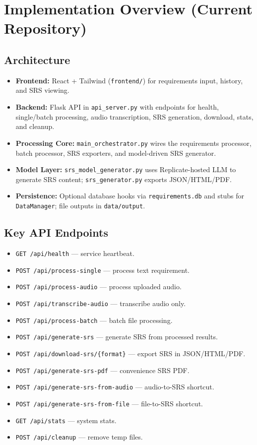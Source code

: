 \documentclass[11pt]{article}
\begin{document}
\section{Implementation Overview (Current Repository)}
\subsection{Architecture}
\begin{itemize}
  \item \textbf{Frontend:} React + Tailwind (\texttt{frontend/}) for requirements input, history, and SRS viewing.
  \item \textbf{Backend:} Flask API in \texttt{api\_server.py} with endpoints for health, single/batch processing, audio transcription, SRS generation, download, stats, and cleanup.
  \item \textbf{Processing Core:} \texttt{main\_orchestrator.py} wires the requirements processor, batch processor, SRS exporters, and model-driven SRS generator.
  \item \textbf{Model Layer:} \texttt{srs\_model\_generator.py} uses Replicate-hosted LLM to generate SRS content; \texttt{srs\_generator.py} exports JSON/HTML/PDF.
  \item \textbf{Persistence:} Optional database hooks via \texttt{requirements.db} and stubs for \texttt{DataManager}; file outputs in \texttt{data/output}.
\end{itemize}

\subsection{Key API Endpoints}
\begin{itemize}
  \item \texttt{GET /api/health} --- service heartbeat.
  \item \texttt{POST /api/process-single} --- process text requirement.
  \item \texttt{POST /api/process-audio} --- process uploaded audio.
  \item \texttt{POST /api/transcribe-audio} --- transcribe audio only.
  \item \texttt{POST /api/process-batch} --- batch file processing.
  \item \texttt{POST /api/generate-srs} --- generate SRS from processed results.
  \item \texttt{POST /api/download-srs/\{format\}} --- export SRS in JSON/HTML/PDF.
  \item \texttt{POST /api/generate-srs-pdf} --- convenience SRS PDF.
  \item \texttt{POST /api/generate-srs-from-audio} --- audio-to-SRS shortcut.
  \item \texttt{POST /api/generate-srs-from-file} --- file-to-SRS shortcut.
  \item \texttt{GET /api/stats} --- system stats.
  \item \texttt{POST /api/cleanup} --- remove temp files.
\end{itemize}
\end{document}
